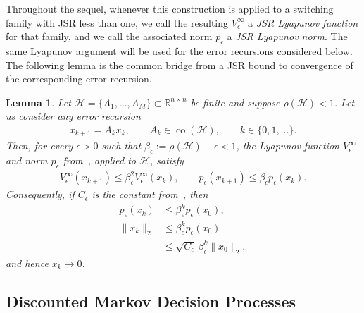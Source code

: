 \documentclass[letterpaper]{article}
\numberwithin{equation}{section}
\newtheorem{lemma}{Lemma}[section]
\newcommand{\R}{\mathbb{R}}
\newcommand{\co}{\operatorname{co}}
\begin{document}
Throughout the sequel, whenever this construction is applied to a switching
family with JSR less than one, we call the resulting $V_\epsilon^\infty$ a \emph{JSR
Lyapunov function} for that family, and we call the associated norm $p_\epsilon$
a \emph{JSR Lyapunov norm}.
The same Lyapunov argument will be used for the error recursions considered
below. The following lemma is the common bridge from a JSR bound to convergence of the corresponding error recursion.
\begin{lemma}
\label{lem:standard_jsr_convergence}
\label{lem:basic_jsr_convergence}
Let $\mathcal H=\{A_1,\ldots,A_M\}\subset\R^{n\times n}$ be finite and suppose
$\rho(\mathcal H)<1$. Let us consider any error recursion
\begin{align*}
x_{k+1}=A_kx_k,
\qquad A_k\in\co(\mathcal H),
\qquad k\in\{0,1,\ldots\}.
\end{align*}
Then, for every $\epsilon>0$ such that
$\beta_\epsilon:=\rho(\mathcal H)+\epsilon<1$, the Lyapunov function
$V_\epsilon^\infty$ and norm $p_\epsilon$ from~, applied to
$\mathcal H$, satisfy
\begin{align*}
V_\epsilon^\infty(x_{k+1})
\leq
\beta_\epsilon^2 V_\epsilon^\infty(x_k),
\qquad
p_\epsilon(x_{k+1})\leq \beta_\epsilon p_\epsilon(x_k).
\end{align*}
Consequently, if $C_\epsilon$ is the constant from~, then
\begin{align*}
p_\epsilon(x_k)&\leq \beta_\epsilon^k p_\epsilon(x_0),\\
\|x_k\|_2
&\leq \beta_\epsilon^k p_\epsilon(x_0)\\
&\leq \sqrt{C_\epsilon}\,\beta_\epsilon^k\|x_0\|_2,
\end{align*}
and hence $x_k\to0$.
\end{lemma}


\subsection{Discounted Markov Decision Processes}
\label{sec:discounted_mdps}
\end{document}
